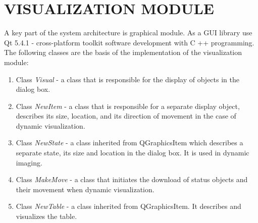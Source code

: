 \documentclass[a4paper, 10pt, conference]{ieeeconf}
\begin{document}
\section{VISUALIZATION MODULE}
A key part of the system architecture is graphical module. As a GUI library use Qt 5.4.1 - cross-platform toolkit software development with C ++ programming.\\
The following classes are the basis of the implementation of the visualization module:
\begin{enumerate}
\item Class \textit{Visual} - a class that is responsible for the display of objects in the dialog box.
\item Class \textit{NewItem} - a class that is responsible for a separate display object, describes its size, location, and its direction of movement in the case of dynamic visualization.
\item Class \textit{NewState} - a class inherited from QGraphicsItem  which describes a separate state, its size and location in the dialog box. It is used in dynamic imaging.
\item Class \textit{MakeMove} - a class that initiates the download of status objects and their movement when dynamic visualization.
\item Class \textit{NewTable} - a class inherited from QGraphicsItem. It describes and visualizes the table.


\end{enumerate}
\end{document}
